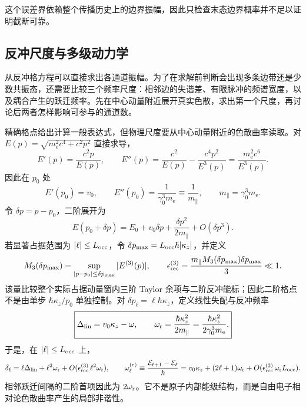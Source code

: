这个误差界依赖整个传播历史上的边界振幅，因此只检查末态边界概率并不足以证明截断可靠。

\subsection{反冲尺度与多级动力学}\label{subsec:recoil-scales-multilevel-dp19}

从反冲格方程可以直接求出各通道振幅。为了在求解前判断会出现多条边带还是少数共振态，还需要比较三个频率尺度：相邻边的失谐差、有限脉冲的频谱宽度，以及耦合产生的跃迁频率。先在中心动量附近展开真实色散，求出第一个尺度，再讨论后两者怎样影响可参与的通道数。

精确格点给出计算一般表达式，但物理尺度要从中心动量附近的色散曲率读取。对
\(E(p)=\sqrt{m_{\mathrm e}^2c^4+c^2p^2}\) 直接求导，
\begin{equation*}
E'(p)=\frac{c^2p}{E(p)},
\qquad
E''(p)=\frac{c^2}{E(p)}-\frac{c^4p^2}{E^3(p)}
=\frac{m_{\mathrm e}^2c^6}{E^3(p)}.
\end{equation*}
因此在 $p_0$ 处
\begin{equation*}
E'(p_0)=v_0,
\qquad
E''(p_0)=\frac1{\gamma_0^3m_{\mathrm e}}
\equiv\frac1{m_\parallel},
\qquad
m_\parallel=\gamma_0^3m_{\mathrm e}.
\end{equation*}
令 $\delta p=p-p_0$，二阶展开为
\begin{equation*}
E(p_0+\delta p)
=E_0+v_0\delta p+\frac{\delta p^2}{2m_\parallel}+O(\delta p^3).
\end{equation*}
若显著占据范围为 $|\ell|\le L_{\rm occ}$，令 $\delta p_{\max}=L_{\rm occ}\hbar|\kappa_z|$，并定义
\begin{equation*}
 M_3(\delta p_{\max})
 =\sup_{|p-p_0|\le \delta p_{\max}}|E^{(3)}(p)|,
 \qquad
 \epsilon_{\rm rec}^{(3)}
 =\frac{m_\parallel M_3(\delta p_{\max})\delta p_{\max}}{3}\ll1.
\end{equation*}
该量比较整个实际占据动量窗内三阶 Taylor 余项与二阶反冲能标；因此二阶格点不是由单步 $\hbar \kappa_z/p_0$ 单独控制。对 $\delta p_\ell=\ell\hbar \kappa_z$，定义线性失配与反冲频率
\begin{equation}
\boxed{
\Delta_{\rm lin}=v_0\kappa_z-\omega,
\qquad
\omega_{\rm r}=\frac{\hbar \kappa_z^2}{2m_\parallel}
=\frac{\hbar \kappa_z^2}{2\gamma_0^3m_{\mathrm e}}.}
\label{eq:recoil_frequency}
\end{equation}
于是，在 $|\ell|\le L_{\rm occ}$ 上，
\begin{equation*}
\delta_\ell
= \ell\Delta_{\rm lin}+\ell^2\omega_{\rm r}
+O(\epsilon_{\rm rec}^{(3)}\,\ell^2\omega_{\rm r}),
\qquad
\omega_\ell^{(e)}\equiv\frac{\mathcal E_{\ell+1}-\mathcal E_\ell}{\hbar}
= v_0\kappa_z+(2\ell+1)\omega_{\rm r}
+O(\epsilon_{\rm rec}^{(3)}\,\omega_{\rm r}L_{\rm occ}).
\end{equation*}
相邻跃迁间隔的二阶首项因此为 $2\omega_{\rm r}$。它不是原子内部能级结构，而是自由电子相对论色散曲率产生的局部非谐性。

